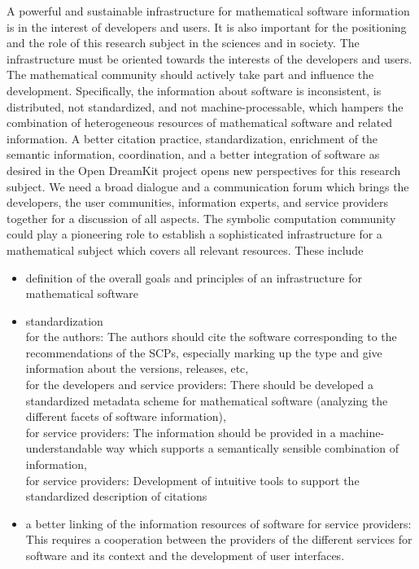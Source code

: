 \documentclass[a4paper,11pt]{article}
\begin{document}
\begin{multicols}{2}
A powerful and sustainable infrastructure for mathematical software information is in the interest of  developers and  users.  It is also important for the positioning and the role of this research subject in the sciences and in society.  The infrastructure must be oriented towards the interests  of the developers and users. The mathematical community  should actively take part and influence the development.
Specifically, the information about software is inconsistent, is distributed, not standardized, and not machine-processable, which hampers the combination of heterogeneous resources of mathematical software and related information. A better citation practice, standardization, enrichment of the semantic information, coordination, and a better integration of software as desired in the Open DreamKit project \cite{OpenDreamKit}  opens new perspectives for this research subject.
We need a broad dialogue and a communication forum which brings the developers, the user communities, information experts, and service providers together for a  discussion of all aspects. The symbolic computation community could play a pioneering role to establish a sophisticated infrastructure for a mathematical subject which covers all relevant resources. These include
\begin{itemize}
\item{definition of the overall goals and principles of an infrastructure for mathematical software}\\
\item{standardization}\\
for the authors: The authors should cite the software corresponding to the recommendations of the SCPs, especially marking up the type and give information about the versions, releases, etc,\\
for the developers and service providers: There should be developed a standardized metadata scheme for mathematical software (analyzing the different facets of software information),\\
for service providers: The information should be provided in a machine-understandable way which supports a semantically sensible combination of information,\\
for service providers: Development of intuitive tools to support the standardized description of citations
\item{a better linking of the information resources of software}
for service providers: This requires a cooperation between the providers of the different services for software and its context and the development of user interfaces.
\end{itemize}


\end{multicols}
\end{document}
